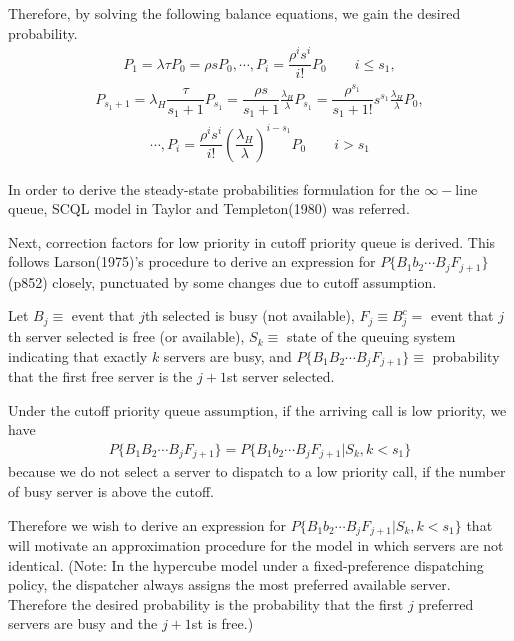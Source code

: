 \documentclass{article}
\begin{document}
Therefore, by solving the following balance equations, we gain the desired probability.
\begin{align*} P_1= \lambda \tau P_0 =\rho s P_0, \cdots, P_i = \dfrac{\rho^i s^i}{i!} P_0 \quad \quad i\leq s_1,
\end{align*}
\begin{align*}
P_{s_1+1} = \lambda_H \dfrac{\tau}{ s_1+1} P_{s_1}=\dfrac{\rho s}{s_1+1} \frac{\lambda_H}{\lambda} P_{s_1}=\dfrac{\rho^{s_1}}{s_1+1!} s^{s_1} \frac{\lambda_H}{\lambda} P_{0},
\end{align*} 
\begin{align*}
\cdots, P_i = \dfrac{\rho^i s^i}{i!} (\dfrac{\lambda_H}{\lambda})^{i-s_1} P_0 \quad \quad i > s_1
\end{align*} 

In order to derive the steady-state probabilities formulation for the $\infty-$line queue, SCQL model in Taylor and Templeton(1980) was referred.

Next, correction factors for low priority in cutoff priority queue is derived. This follows Larson(1975)'s procedure to derive an expression for $P \{ B_1b_2 \cdots B_jF_{j+1}\}$ (p852) closely, punctuated by some changes due to cutoff assumption. 

Let $B_j \equiv $ event that $j$th selected is busy (not available), $F_j \equiv B_j^c =$ event that $j$th server selected is free (or available), $S_k \equiv $  state of the queuing system indicating that exactly $k$ servers are busy, and $P \{ B_1B_2 \cdots B_j F_{j+1}\} \equiv $ probability that the first free server is the $j+1$st server selected. 

Under the cutoff priority queue assumption, if the arriving call is low priority, we have 
\begin{align*}P \{ B_1B_2 \cdots B_j F_{j+1}\}=P \{ B_1b_2 \cdots B_jF_{j+1}|S_k,k<s_1\}
\end{align*}
because we do not select a server to dispatch to a low priority call, if the number of busy server is above the cutoff.

Therefore we wish to derive an expression for $P \{ B_1b_2 \cdots B_jF_{j+1}|S_k,k<s_1\}$ that will motivate an approximation procedure for the model in which servers are not identical. (Note: In the hypercube model under a fixed-preference dispatching policy, the dispatcher always assigns the most preferred available server. Therefore the desired probability is the probability that the first $j$ preferred servers are busy and the $j+1$st is free.)
\end{document}
